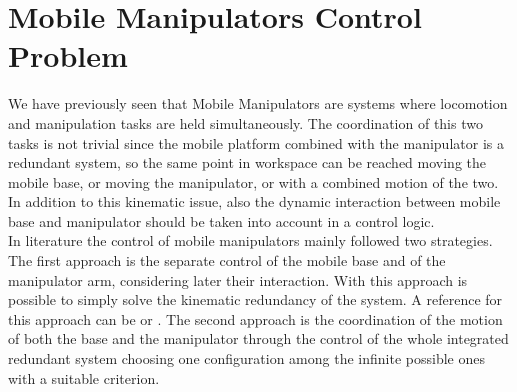 
\chapter{Mobile Manipulators Control Problem}
\label{chapter4}
We have previously seen that Mobile Manipulators are systems where locomotion and manipulation tasks are held simultaneously. The coordination of this two tasks is not trivial since the mobile platform combined with the manipulator is a redundant system, so the same point in workspace can be reached moving the mobile base, or moving the manipulator, or with a combined motion of the two. In addition to this kinematic issue, also the dynamic interaction between mobile base and manipulator should be taken into account in a control logic. \\
In literature the control of mobile manipulators mainly followed two strategies. The first approach is the separate control of the mobile base and of the manipulator arm, considering later their interaction. With this approach is possible to simply solve the kinematic redundancy of the system. A reference for this approach can be \cite{liulewis} or \cite{chung1998interaction}. The second approach is the coordination of the motion of both the base and the manipulator through the control of the whole integrated redundant system choosing one configuration among the infinite possible ones with a suitable criterion.\\
